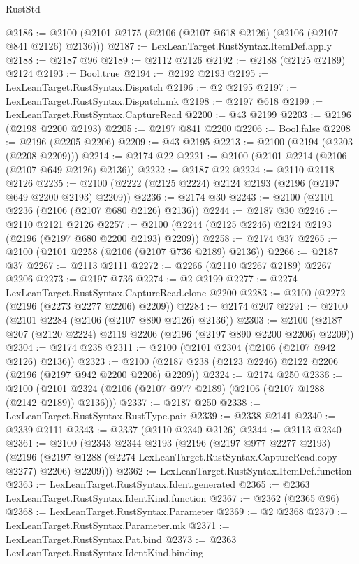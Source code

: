 \begin{lexlean}{RustStd}
\begin{coremodule}
{\begin{coremodule}
{{{{{{{{{{{{{{{{{{{{{{{{{{{{{{{{{{{{{{{{{{{{{{{{{{@2186 := @2100 (@2101 @2175 (@2106 (@2107 @618 @2126) (@2106 (@2107 @841 @2126) @2136)))
@2187 := LexLeanTarget.RustSyntax.ItemDef.apply
@2188 := @2187 @96
@2189 := @2112 @2126
@2192 := @2188 (@2125 @2189) @2124
@2193 := Bool.true
@2194 := @2192 @2193
@2195 := LexLeanTarget.RustSyntax.Dispatch
@2196 := @2 @2195
@2197 := LexLeanTarget.RustSyntax.Dispatch.mk
@2198 := @2197 @618
@2199 := LexLeanTarget.RustSyntax.CaptureRead
@2200 := @43 @2199
@2203 := @2196 (@2198 @2200 @2193)
@2205 := @2197 @841 @2200
@2206 := Bool.false
@2208 := @2196 (@2205 @2206)
@2209 := @43 @2195
@2213 := @2100 (@2194 (@2203 (@2208 @2209)))
@2214 := @2174 @22
@2221 := @2100 (@2101 @2214 (@2106 (@2107 @649 @2126) @2136))
@2222 := @2187 @22
@2224 := @2110 @2118 @2126
@2235 := @2100 (@2222 (@2125 @2224) @2124 @2193 (@2196 (@2197 @649 @2200 @2193) @2209))
@2236 := @2174 @30
@2243 := @2100 (@2101 @2236 (@2106 (@2107 @680 @2126) @2136))
@2244 := @2187 @30
@2246 := @2110 @2121 @2126
@2257 := @2100 (@2244 (@2125 @2246) @2124 @2193 (@2196 (@2197 @680 @2200 @2193) @2209))
@2258 := @2174 @37
@2265 := @2100 (@2101 @2258 (@2106 (@2107 @736 @2189) @2136))
@2266 := @2187 @37
@2267 := @2113 @2111
@2272 := @2266 (@2110 @2267 @2189) @2267 @2206
@2273 := @2197 @736
@2274 := @2 @2199
@2277 := @2274 LexLeanTarget.RustSyntax.CaptureRead.clone @2200
@2283 := @2100 (@2272 (@2196 (@2273 @2277 @2206) @2209))
@2284 := @2174 @207
@2291 := @2100 (@2101 @2284 (@2106 (@2107 @890 @2126) @2136))
@2303 := @2100 (@2187 @207 (@2120 @2224) @2119 @2206 (@2196 (@2197 @890 @2200 @2206) @2209))
@2304 := @2174 @238
@2311 := @2100 (@2101 @2304 (@2106 (@2107 @942 @2126) @2136))
@2323 := @2100 (@2187 @238 (@2123 @2246) @2122 @2206 (@2196 (@2197 @942 @2200 @2206) @2209))
@2324 := @2174 @250
@2336 := @2100 (@2101 @2324 (@2106 (@2107 @977 @2189) (@2106 (@2107 @1288 (@2142 @2189)) @2136)))
@2337 := @2187 @250
@2338 := LexLeanTarget.RustSyntax.RustType.pair
@2339 := @2338 @2141
@2340 := @2339 @2111
@2343 := @2337 (@2110 @2340 @2126)
@2344 := @2113 @2340
@2361 := @2100
    (@2343
      @2344
      @2193
      (@2196
        (@2197 @977 @2277 @2193)
        (@2196 (@2197 @1288 (@2274 LexLeanTarget.RustSyntax.CaptureRead.copy @2277) @2206) @2209)))
@2362 := LexLeanTarget.RustSyntax.ItemDef.function
@2363 := LexLeanTarget.RustSyntax.Ident.generated
@2365 := @2363 LexLeanTarget.RustSyntax.IdentKind.function
@2367 := @2362 (@2365 @96)
@2368 := LexLeanTarget.RustSyntax.Parameter
@2369 := @2 @2368
@2370 := LexLeanTarget.RustSyntax.Parameter.mk
@2371 := LexLeanTarget.RustSyntax.Pat.bind
@2373 := @2363 LexLeanTarget.RustSyntax.IdentKind.binding
}}}}}}}}}}}}}}}}}}}}}}}}}}}}}}}}}}}}}}}}}}}}}}}}}}
\end{coremodule}}
\end{coremodule}
\end{lexlean}
